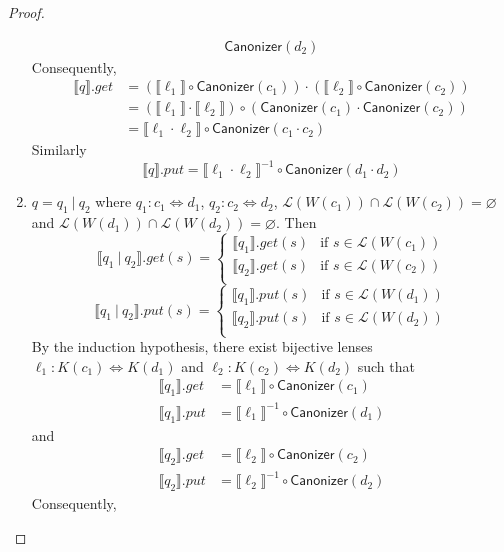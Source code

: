 \documentclass[acmsmall,review,anonymous]{acmart}
\newcommand{\kw}[1]{\ensuremath{\mathsf{#1}}}
\newcommand{\sep}{\ensuremath{\ | \ }}
\newcommand{\canonizer}{\ensuremath{\kw{Canonizer}}}
\begin{document}
\begin{proof}
\begin{enumerate}
\begin{align*}
\canonizer(d_2)
\end{align*}
Consequently,
\begin{align*}
\llbracket q \rrbracket.get &= (\llbracket \ell_1 \rrbracket \circ
\canonizer(c_1)) \cdot  (\llbracket \ell_2 \rrbracket \circ
\canonizer(c_2))\\
&= (\llbracket \ell_1 \rrbracket \cdot \llbracket \ell_2
\rrbracket) \circ (\canonizer(c_1) \cdot \canonizer(c_2))\\
&= \llbracket \ell_1 \cdot  \ell_2 \rrbracket \circ \canonizer(c_1 \cdot c_2)
\end{align*}
Similarly
$$
\llbracket q \rrbracket.put = \llbracket \ell_1 \cdot  \ell_2 \rrbracket^{-1}
\circ \canonizer(d_1 \cdot d_2) $$
\item
$q = q_1 \sep q_2$ where $q_1 : c_1 \Leftrightarrow d_1 $, $q_2 : c_2
\Leftrightarrow d_2$, $\mathcal{L}(W(c_1)) \cap \mathcal{L}(W(c_2)) =
\varnothing$ and $\mathcal{L}(W(d_1)) \cap \mathcal{L}(W(d_2)) = \varnothing$.
Then
$$
\llbracket q_1 \sep q_2 \rrbracket.get(s) =
\begin{cases}
\llbracket q_1 \rrbracket.get (s) & \text{if } s \in \mathcal{L}(W(c_1))\\
\llbracket q_2 \rrbracket.get (s) & \text{if } s \in \mathcal{L}(W(c_2))\\
\end{cases}$$
$$\llbracket q_1 \sep q_2 \rrbracket.put(s) =
\begin{cases}
\llbracket q_1 \rrbracket.put (s) & \text{if } s \in \mathcal{L}(W(d_1))\\
\llbracket q_2 \rrbracket.put (s) & \text{if } s \in \mathcal{L}(W(d_2))\\
\end{cases}
$$
By the induction hypothesis, there exist bijective lenses $\ell_1 : K(c_1)
\Leftrightarrow K(d_1)$ and $\ell_2 : K(c_2) \Leftrightarrow K(d_2)$ such that
\begin{align*}
\llbracket q_1 \rrbracket.get &= \llbracket \ell_1 \rrbracket \circ
\canonizer(c_1)\\
\llbracket q_1 \rrbracket.put &= {\llbracket \ell_1 \rrbracket}^{-1} \circ
\canonizer(d_1)
\end{align*}
and
\begin{align*}
\llbracket q_2 \rrbracket.get &= \llbracket \ell_2 \rrbracket \circ
\canonizer(c_2)\\
\llbracket q_2 \rrbracket.put &= {\llbracket \ell_2 \rrbracket}^{-1} \circ
\canonizer(d_2)
\end{align*}
Consequently,

\end{enumerate}
\end{proof}
\end{document}
